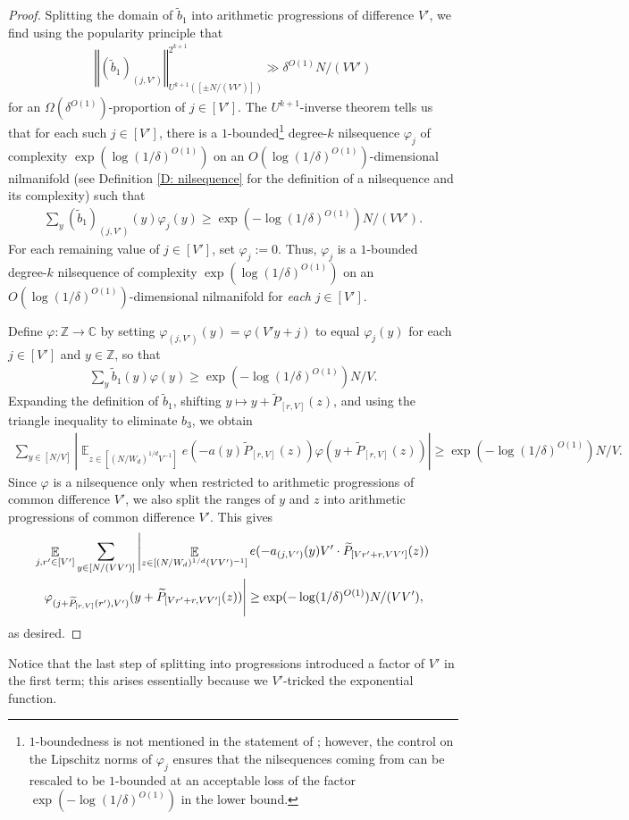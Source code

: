 \documentclass[11pt]{amsart}
\theoremstyle{definition}
\DeclareMathOperator*{\E}{\mathbb{E}}
\newcommand{\C}{{\mathbb C}}
\newcommand{\Z}{{\mathbb Z}}
\newcommand{\norm}[1]{\left\Vert #1\right\Vert}
\begin{document}
\begin{proof}
Splitting the domain of $\tilde{b}_1$ into arithmetic progressions of difference $V'$, we find using the popularity principle that
\begin{align*}
    \norm{(\tilde{b}_1)_{(j, V')}}_{U^{k+1}([\pm N/(VV')])}^{2^{k+1}}\gg \delta^{O(1)} N/(VV')
\end{align*}
for an $\Omega(\delta^{O(1)})$-proportion of $j\in[V']$.  The $U^{k+1}$-inverse theorem \cite[Theorem 1.2]{LSS24} tells us that for each such $j\in[V']$, there is a $1$-bounded\footnote{$1$-boundedness is not mentioned in the statement of \cite[Theorem 1.2]{LSS24}; however, the control on the Lipschitz norms of $\varphi_j$ ensures that the nilsequences coming from \cite[Theorem 1.2]{LSS24} can be rescaled to be $1$-bounded at an acceptable loss of the factor $\exp(-\log(1/\delta)^{O(1)})$ in the lower bound.} degree-$k$ nilsequence $\varphi_j$ of complexity $\exp(\log(1/\delta)^{O(1)})$ on an $O(\log(1/\delta)^{O(1)})$-dimensional nilmanifold (see Definition \ref{D: nilsequence} for the definition of a nilsequence and its complexity)
such that
\begin{align*}
    \sum_y (\tilde{b}_1)_{(j,V')}(y)\varphi_j(y) \geq \exp(-\log(1/\delta)^{O(1)})N/(VV').
\end{align*}
For each remaining value of $j\in[V']$, set $\varphi_j:= 0$.
Thus, $\varphi_j$ is a $1$-bounded degree-$k$ nilsequence of complexity $\exp(\log(1/\delta)^{O(1)})$ on an $O(\log(1/\delta)^{O(1)})$-dimensional nilmanifold for \textit{each} $j\in [V']$.

Define $\varphi:\Z\to\C$ by setting $ \varphi_{(j,V')}(y)=\varphi(V'y + j)$ to equal $\varphi_j(y)$ for each $j\in[V']$ and $y\in\Z$, so that
\begin{align*}
    \sum_y \tilde{b}_1(y)\varphi(y) \geq \exp(-\log(1/\delta)^{O(1)})N/V.
\end{align*}
Expanding the definition of $\widetilde b_1$, shifting $y \mapsto y+\widetilde P_{[r,V]}(z)$, and using the triangle inequality to eliminate $b_3$, we obtain
\begin{align*}
    \sum_{y\in[N/V]}\left|\E_{z \in [(N/W_d)^{1/d}V^{-1}]} e(-a(y)\widetilde{P}_{[r,V]}(z)) \varphi(y + \widetilde{P}_{[r,V]}(z))\right| \geq \exp(-\log(1/\delta)^{O(1)}) N/V.
\end{align*}
Since $\varphi$ is a nilsequence only when restricted to arithmetic progressions of common difference $V'$, we also split the ranges of $y$ and $z$ into arithmetic progressions of common difference $V'$.  This gives
\begin{multline*}
    \E_{j, r'\in[V']}\sum_{y\in[N/(VV')]}\left|\E_{z \in [(N/W_d)^{1/d}(VV')^{-1}]} e(-a_{(j, V')}(y)V'\cdot\widetilde{P}_{[Vr'+r,VV']}(z))\right.\\
    \left.\varphi_{({j} + \widetilde{P}_{[r,V]}(r'), V')}(y + \widetilde{P}_{[Vr'+r,VV']}(z)) \vphantom{\E_{z \in [(N/W_d)^{1/d}(VV')^{-1}]}} \right| \geq \exp(-\log(1/\delta)^{O(1)}) N/(VV'),
\end{multline*}
as desired.
\end{proof}
Notice that the last step of splitting into progressions introduced a factor of $V'$ in the first term; this arises essentially because we $V'$-tricked the exponential function.
\end{document}
